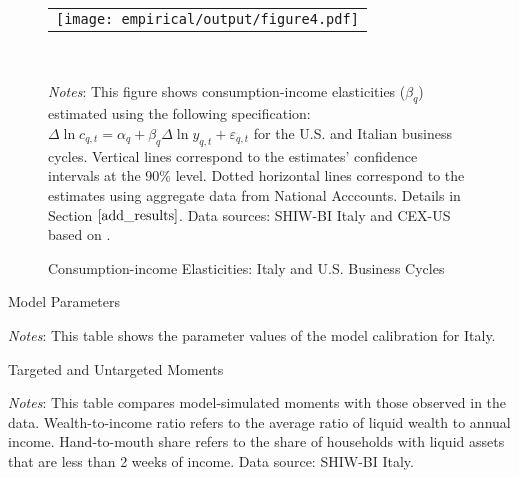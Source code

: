 \documentclass[12pt]{article}
\begin{document}
\begin{spacing}{1.5}
\begin{figure}[H]
\caption{Consumption-income Elasticities: Italy and U.S. Business Cycles}\label{ita_us_buscycle}
\begin{tabular}{cc}
\multicolumn{2}{c}{\texttt{[image: empirical/output/figure4.pdf]}}
\end{tabular} \\
\medskip{}
\raggedright{}\textit{\footnotesize{}Notes}{\footnotesize{}: This figure shows consumption-income  elasticities ($\beta_q$) estimated using the following specification: $\Delta \ln c_{q,t} = \alpha_q + \beta_q \Delta \ln y_{q,t} + \varepsilon_{q,t}$ for the U.S. and Italian business cycles. Vertical lines correspond to the estimates' confidence intervals at the 90\% level. Dotted horizontal lines correspond to the estimates using aggregate data from National Acccounts. Details in Section $\ref{add_results}$. Data  sources: SHIW-BI Italy and CEX-US based on \citet{dauchy2020RED}.}{\footnotesize\par}
\end{figure}


\begin{table}[H]
\begin{centering}
\caption{Model Parameters}

\label{c_param}
\end{centering}
\medskip{}

\raggedright{}\textit{\footnotesize{}Notes}{\footnotesize{}: This table shows the parameter values of the model calibration for Italy.
  }{\footnotesize\par}
\end{table}


\begin{table}[H]
\begin{centering}
\caption{Targeted and Untargeted Moments}

\label{tab_moments}
\end{centering}
\medskip{}

\raggedright{}\textit{\footnotesize{}Notes}{\footnotesize{}: This table compares model-simulated moments with those observed in the data. Wealth-to-income ratio refers to the average ratio of liquid wealth to annual income. Hand-to-mouth share refers to the share of households with liquid assets that are less than 2 weeks of income. Data source: SHIW-BI Italy.
  }{\footnotesize\par}
\end{table}



\end{spacing}
\end{document}
